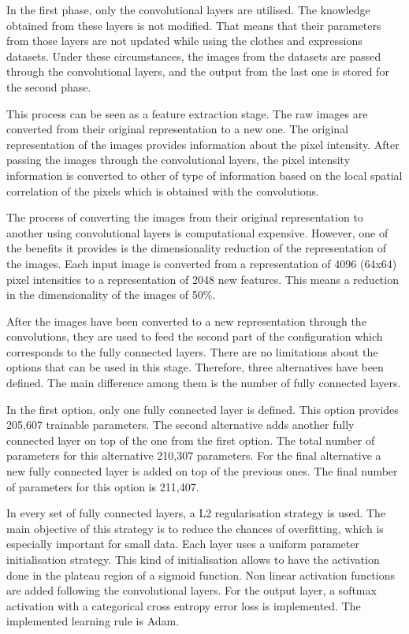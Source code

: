 \documentclass{article}
\begin{document}
In the first phase, only the convolutional layers are utilised. The knowledge obtained from these layers is not modified. That means that their parameters from those layers are not updated while using the clothes and expressions datasets. Under these circumstances, the images from the datasets are passed through the convolutional layers, and the output from the last one is stored for the second phase.

This process can be seen as a feature extraction stage. The raw images are converted from their original representation to a new one. The original representation of the images provides information about the pixel intensity. After passing the images through the convolutional layers, the pixel intensity information is converted to other of type of information based on the local spatial correlation of the pixels which is obtained with the convolutions.

The process of converting the images from their original representation to another using convolutional layers is computational expensive. However, one of the benefits it provides is the dimensionality reduction of the representation of the images. Each input image is converted from a representation of 4096 (64x64) pixel intensities to a representation of 2048 new features. This means a reduction in the dimensionality of the images of 50\%.

After the images have been converted to a new representation through the convolutions, they are used to feed the second part of the configuration which corresponds to the fully connected layers. There are no limitations about the options that can be used in this stage. Therefore, three alternatives have been defined. The main difference among them is the number of fully connected layers.

In the first option, only one fully connected layer is defined. This option provides 205,607 trainable parameters. The second alternative adds another fully connected layer on top of the one from the first option. The total number of parameters for this alternative 210,307 parameters. For the final alternative a new fully connected layer is added on top of the previous ones. The final number of parameters for this option is 211,407.

In every set of fully connected layers, a L2 regularisation strategy is used. The main objective of this strategy is to reduce the chances of overfitting, which is especially important for small data. Each layer uses a uniform parameter initialisation strategy. This kind of initialisation allows to have the activation done in the plateau region of a sigmoid function. Non linear activation functions are added following the convolutional layers. For the output layer, a softmax activation with a categorical cross entropy error loss is implemented. The implemented learning rule is Adam.
\end{document}
